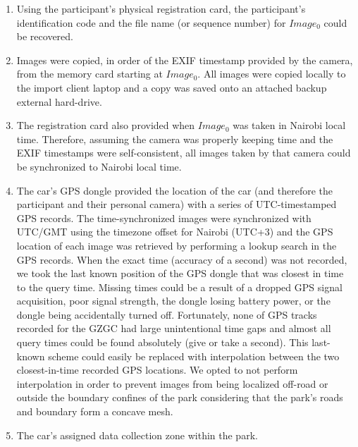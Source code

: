 \begin{enumerate}
    \item Using the participant's physical registration card, the participant's identification code and the file name (or sequence number) for $Image_0$ could be recovered.
    \item Images were copied, in order of the EXIF timestamp provided by the camera, from the memory card starting at $Image_0$.  All images were copied locally to the import client laptop and a copy was saved onto an attached backup external hard-drive.
    \item The registration card also provided when $Image_0$ was taken in Nairobi local time.  Therefore, assuming the camera was properly keeping time and the EXIF timestamps were self-consistent, all images taken by that camera could be synchronized to Nairobi local time.
    \item The car's GPS dongle provided the location of the car (and therefore the participant and their personal camera) with a series of UTC-timestamped GPS records.  The time-synchronized images were synchronized with UTC/GMT using the timezone offset for Nairobi (UTC+3) and the GPS location of each image was retrieved by performing a lookup search in the GPS records.  When the exact time (accuracy of a second) was not recorded, we took the last known position of the GPS dongle that was closest in time to the query time.  Missing times could be a result of a dropped GPS signal acquisition, poor signal strength, the dongle losing battery power, or the dongle being accidentally turned off.  Fortunately, none of GPS tracks recorded for the GZGC had large unintentional time gaps and almost all query times could be found absolutely (give or take a second).  This last-known scheme could easily be replaced with interpolation between the two closest-in-time recorded GPS locations.  We opted to not perform interpolation in order to prevent images from being localized off-road or outside the boundary confines of the park considering that the park's roads and boundary form a concave mesh.
    \item The car's assigned data collection zone within the park.
\end{enumerate}

